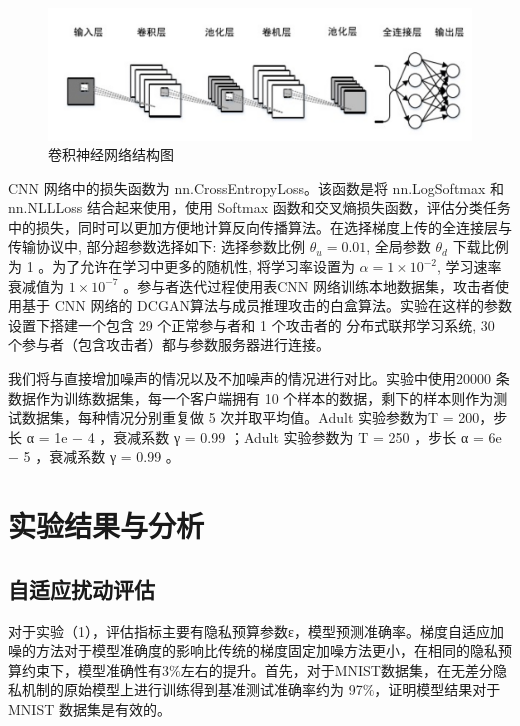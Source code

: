 \begin{figure}[!hbt]
\centering
  	\includegraphics[scale=0.6]{fig2/C5/CNN结构}%
	\caption{卷积神经网络结构图}
  	\label{fig:卷积神经网络结构图} 
\end{figure}

CNN 网络中的损失函数为 nn.CrossEntropyLoss。该函数是将 nn.LogSoftmax 和nn.NLLLoss 结合起来使用，使用 Softmax 函数和交叉熵损失函数，评估分类任务中的损失，同时可以更加方便地计算反向传播算法。在选择梯度上传的全连接层与传输协议中, 部分超参数选择如下: 选择参数比例 $\theta_{u}=0.01$, 全局参数 $\theta_{d}$ 下载比例为 1 。为了允许在学习中更多的随机性, 将学习率设置为 $\alpha=1 \times 10^{-2}$, 学习速率衰减值为 $1 \times 10^{-7}$ 。参与者迭代过程使用表$\mathrm{CNN}$ 网络训练本地数据集，攻击者使用基于 CNN 网络的 DCGAN算法与成员推理攻击的白盒算法。实验在这样的参数设置下搭建一个包含 29 个正常参与者和 1 个攻击者的 分布式联邦学习系统, 30 个参与者（包含攻击者）都与参数服务器进行连接。

我们将与直接增加噪声的情况以及不加噪声的情况进行对比。实验中使用20000 条数据作为训练数据集，每一个客户端拥有 10 个样本的数据，剩下的样本则作为测试数据集，每种情况分别重复做 5 次并取平均值。Adult 实验参数为T = 200，步长 α = 1e − 4 ，衰减系数 γ = 0.99 ；Adult 实验参数为 T = 250 ，步长 α = 6e − 5 ，衰减系数 γ = 0.99 。


\section{实验结果与分析}
\subsection{自适应扰动评估}
对于实验（1），评估指标主要有隐私预算参数ε，模型预测准确率。梯度自适应加噪的方法对于模型准确度的影响比传统的梯度固定加噪方法更小，在相同的隐私预算约束下，模型准确性有3$\%$左右的提升。首先，对于MNIST数据集，在无差分隐私机制的原始模型上进行训练得到基准测试准确率约为 97$\%$，证明模型结果对于 MNIST 数据集是有效的。 

